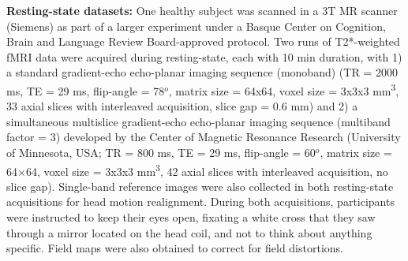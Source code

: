 \textbf{Resting-state datasets:} One healthy subject was scanned in a 3T MR scanner (Siemens) as part of a larger experiment under a Basque Center on Cognition, Brain and Language Review Board-approved protocol. Two runs of T2*-weighted fMRI data were acquired during resting-state, each with 10 min duration, with 1) a standard gradient-echo echo-planar imaging sequence (monoband) (TR = 2000 ms, TE = 29 ms, flip-angle = 78\(^o\), matrix size = 64x64, voxel size = 3x3x3 mm\textsuperscript{3}, 33 axial slices with interleaved acquisition, slice gap = 0.6 mm) and 2) a simultaneous multislice gradient-echo echo-planar imaging sequence (multiband factor = 3) developed by the Center of Magnetic Resonance Research (University of Minnesota, USA; TR = 800 ms, TE = 29 ms, flip-angle = 60\(^o\), matrix size = 64×64, voxel size = 3x3x3 mm\textsuperscript{3}, 42 axial slices with interleaved acquisition, no slice gap). Single-band reference images were also collected in both resting-state acquisitions for head motion realignment. During both acquisitions, participants were instructed to keep their eyes open, fixating a white cross that they saw through a mirror located on the head coil, and not to think about anything specific. Field maps were also obtained to correct for field distortions.
